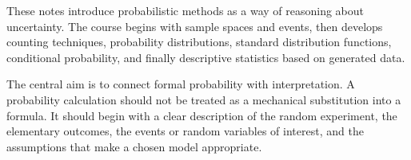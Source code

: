 These notes introduce probabilistic methods as a way of reasoning about uncertainty. The course begins with sample spaces and events, then develops counting techniques, probability distributions, standard distribution functions, conditional probability, and finally descriptive statistics based on generated data.

The central aim is to connect formal probability with interpretation. A probability calculation should not be treated as a mechanical substitution into a formula. It should begin with a clear description of the random experiment, the elementary outcomes, the events or random variables of interest, and the assumptions that make a chosen model appropriate.
